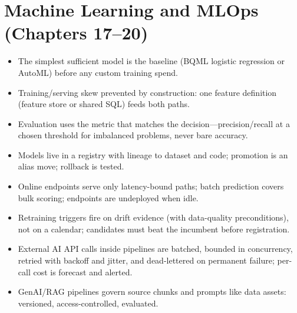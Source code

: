 \section{Machine Learning and MLOps (Chapters 17--20)}
\begin{itemize}
    \item[$\square$] The simplest sufficient model is the baseline (BQML logistic regression or
    AutoML) before any custom training spend.
    \item[$\square$] Training/serving skew prevented by construction: one feature definition
    (feature store or shared SQL) feeds both paths.
    \item[$\square$] Evaluation uses the metric that matches the decision---precision/recall at a
    chosen threshold for imbalanced problems, never bare accuracy.
    \item[$\square$] Models live in a registry with lineage to dataset and code; promotion is an
    alias move; rollback is tested.
    \item[$\square$] Online endpoints serve only latency-bound paths; batch prediction covers bulk
    scoring; endpoints are undeployed when idle.
    \item[$\square$] Retraining triggers fire on drift evidence (with data-quality preconditions),
    not on a calendar; candidates must beat the incumbent before registration.
    \item[$\square$] External AI API calls inside pipelines are batched, bounded in concurrency,
    retried with backoff and jitter, and dead-lettered on permanent failure; per-call cost is
    forecast and alerted.
    \item[$\square$] GenAI/RAG pipelines govern source chunks and prompts like data assets:
    versioned, access-controlled, evaluated.
\end{itemize}

